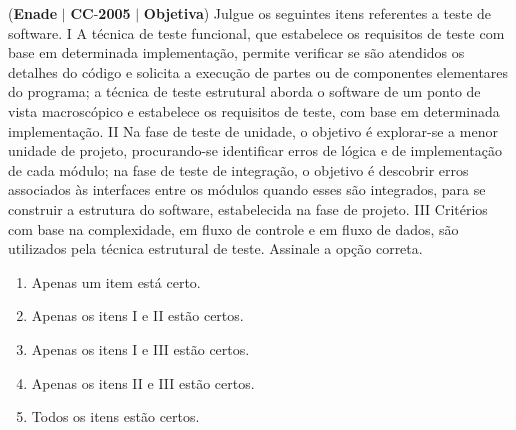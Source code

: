 \documentclass{exam}
\begin{document}
\begin{questions}
\question (\textbf{Enade} $|$ \textbf{CC}-\textbf{2005} $|$ \textbf{Objetiva})
Julgue os seguintes itens referentes a teste de software.
I A técnica de teste funcional, que estabelece os requisitos de
teste com base em determinada implementação, permite
verificar se são atendidos os detalhes do código e solicita a
execução de partes ou de componentes elementares do
programa; a técnica de teste estrutural aborda o software de
um ponto de vista macroscópico e estabelece os requisitos
de teste, com base em determinada implementação.
II Na fase de teste de unidade, o objetivo é explorar-se a
menor unidade de projeto, procurando-se identificar erros de
lógica e de implementação de cada módulo; na fase de teste
de integração, o objetivo é descobrir erros associados às
interfaces entre os módulos quando esses são integrados,
para se construir a estrutura do software, estabelecida na
fase de projeto.
III Critérios com base na complexidade, em fluxo de controle
e em fluxo de dados, são utilizados pela técnica estrutural de
teste.
Assinale a opção correta.
	\begin{enumerate}[label=\alph*)]
		\item  Apenas um item está certo.
		\item  Apenas os itens I e II estão certos.
		\item  Apenas os itens I e III estão certos.
		\item  Apenas os itens II e III estão certos.
		\item  Todos os itens estão certos.
	\end{enumerate}


\end{questions}
\end{document}
